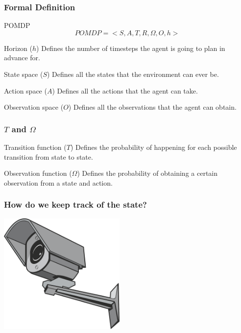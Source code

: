 \documentclass[xcolor={dvipsnames}]{beamer}
\begin{document}
\begin{frame}
\frametitle{Formal Definition}
\begin{block}{POMDP}
\begin{equation}
 POMDP = <S,A,T,R,\Omega,O,h> \nonumber
\end{equation}
\end{block}
\begin{block}{Horizon ($h$)}
    Defines the number of timesteps the agent is going to plan in advance for.
\end{block}
\begin{block}{State space ($S$)}
    Defines all the states that the environment can ever be.
\end{block}
\begin{block}{Action space ($A$)}
    Defines all the actions that the agent can take.
\end{block}
\begin{block}{Observation space ($O$)}
    Defines all the observations that the agent can obtain.
\end{block}
\end{frame}

\begin{frame}
\frametitle{$T$ and $\Omega$}
\begin{block}{Transition function ($T$)}
    Defines the probability of happening for each possible transition from state to state.
\end{block}
\begin{block}{Observation function ($\Omega$)}
    Defines the probability of obtaining a certain observation from a state and action.
\end{block}
\end{frame}

\begin{frame}
\frametitle{How do we keep track of the state?}
\centerline{\includegraphics[height=6cm]{images/camera.png}}
\end{frame}
\end{document}
